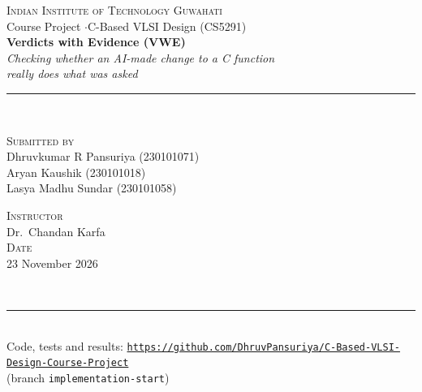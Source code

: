 \documentclass[10pt,a4paper]{article}
\begin{document}
\thispagestyle{empty}
\vspace*{\fill}
\begin{center}
{\large\scshape\color{ink} Indian Institute of Technology Guwahati}\\[2pt]
{\small\color{black!70} Course Project \quad$\cdot$\quad C-Based VLSI Design (CS5291)}\\[14pt]
\vspace{14pt}
{\fontsize{30}{36}\selectfont\bfseries\color{ink} Verdicts with Evidence (VWE)}\\[10pt]
{\Large\itshape\color{acc} Checking whether an AI-made change to a C function\\[2pt] really does what was asked}\\[10pt]
{\color{ink}\rule{0.8\linewidth}{0.6pt}}\\[16pt]
\begin{minipage}[t]{0.48\linewidth}\centering
{\small\scshape\color{acc} Submitted by}\\[4pt]
Dhruvkumar R Pansuriya (230101071)\\
Aryan Kaushik (230101018)\\
Lasya Madhu Sundar (230101058)
\end{minipage}\hfill
\begin{minipage}[t]{0.48\linewidth}\centering
{\small\scshape\color{acc} Instructor}\\[4pt]
Dr.\ Chandan Karfa\\[10pt]
{\small\scshape\color{acc} Date}\\[4pt]
23 November 2026
\end{minipage}\\[16pt]
{\color{black!30}\rule{0.6\linewidth}{0.4pt}}\\[6pt]
{\small Code, tests and results:
\href{https://github.com/DhruvPansuriya/C-Based-VLSI-Design-Course-Project/tree/implementation-start}{\nolinkurl{https://github.com/DhruvPansuriya/C-Based-VLSI-Design-Course-Project}}\\
(branch \texttt{implementation-start})}
\end{center}
\vspace{2pt}
\end{document}

